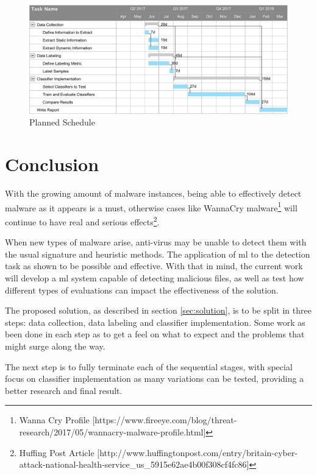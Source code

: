 \documentclass{llncs}
\begin{document}
\begin{figure}[h]
	\includegraphics[width=\textwidth]{gantt}
	\caption{Planned Schedule}
	\label{fig:schedule}
\end{figure}


\section{Conclusion}\label{sec:conclusion}

With the growing amount of malware instances, being able to effectively detect malware as it appears is a must, otherwise cases like WannaCry malware\footnote{Wanna Cry Profile [https://www.fireeye.com/blog/threat-research/2017/05/wannacry-malware-profile.html]} will continue to have real and serious effects\footnote{Huffing Post Article [http://www.huffingtonpost.com/entry/britain-cyber-attack-national-health-service\_us\_5915e62ae4b00f308cf4fc86]}.

When new types of malware arise, anti-virus may be unable to detect them with the usual signature and heuristic methods. The application of \gls{ml} to the detection task as shown to be possible and effective\cite{kolter:learning,miller:rev_int,nissim:al_pdf,perdisci:behavior,rieck:dynamic,schultz:data_mining}. With that in mind, the current work will develop a \gls{ml} system capable of detecting malicious files, as well as test how different types of evaluations can impact the effectiveness of the solution.

The proposed solution, as described in section \ref{sec:solution}, is to be split in three steps: data collection, data labeling and classifier implementation. Some work as been done in each step as to get a feel on what to expect and the problems that might surge along the way.

The next step is to fully terminate each of the sequential stages, with special focus on classifier implementation as many variations can be tested, providing a better research and final result.
\end{document}
